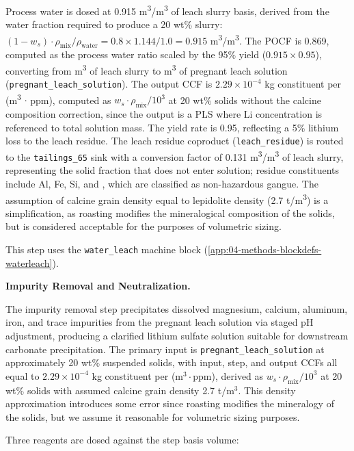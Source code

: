 Process water is dosed at 0.915 m\textsuperscript{3}/m\textsuperscript{3} of leach slurry basis, derived from the water fraction required to produce a 20 wt\% slurry: $(1 - w_s) \cdot \rho_{\text{mix}} / \rho_{\text{water}} = 0.8 \times 1.144 / 1.0 = 0.915$ m\textsuperscript{3}/m\textsuperscript{3}. The POCF is 0.869, computed as the process water ratio scaled by the 95\% yield ($0.915 \times 0.95$), converting from m\textsuperscript{3} of leach slurry to m\textsuperscript{3} of pregnant leach solution (\texttt{pregnant\_leach\_solution}). The output CCF is $2.29 \times 10^{-4}$ kg constituent per (m\textsuperscript{3} $\cdot$ ppm), computed as $w_s \cdot \rho_{\text{mix}} / 10^3$ at 20 wt\% solids without the calcine composition correction, since the output is a PLS where Li concentration is referenced to total solution mass. The yield rate is 0.95, reflecting a 5\% lithium loss to the leach residue. The leach residue coproduct (\texttt{leach\_residue}) is routed to the \texttt{tailings\_65} sink with a conversion factor of 0.131 m\textsuperscript{3}/m\textsuperscript{3} of leach slurry, representing the solid fraction that does not enter solution; residue constituents include Al, Fe, Si, and , which are classified as non-hazardous gangue. The assumption of calcine grain density equal to lepidolite density (2.7 t/m\textsuperscript{3}) is a simplification, as roasting modifies the mineralogical composition of the solids, but is considered acceptable for the purposes of volumetric sizing.

This step uses the \texttt{water\_leach} machine block (\ref{app:04-methods-blockdefs-waterleach}).

\medskip
\noindent\textbf{Impurity Removal and Neutralization.}\quad

The impurity removal step precipitates dissolved magnesium, calcium, aluminum, iron, and trace impurities from the pregnant leach solution via staged pH adjustment, producing a clarified lithium sulfate solution suitable for downstream carbonate precipitation. The primary input is \texttt{pregnant\_leach\_solution} at approximately 20 wt\% suspended solids, with input, step, and output CCFs all equal to $2.29 \times 10^{-4}$ kg constituent per (m$^{3} \cdot$ppm), derived as $w_s \cdot \rho_\text{mix} / 10^3$ at 20 wt\% solids with assumed calcine grain density 2.7 t/m$^3$. This density approximation introduces some error since roasting modifies the mineralogy of the solids, but we assume it reasonable for volumetric sizing purposes.
 
Three reagents are dosed against the step basis volume:
 
